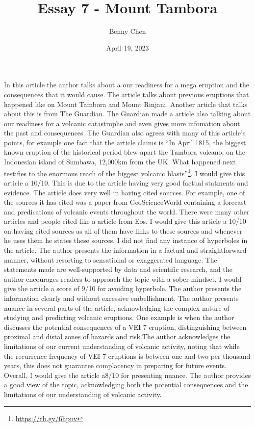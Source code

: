 \documentclass{article}
\title{Essay 7 - Mount Tambora}
\author{Benny Chen}
\date{April 19, 2023}
\begin{document}
\maketitle

In this article the author talks about a our readiness for a mega eruption and the consequences that it would cause. The article talks about previous eruptions that happened like on Mount Tambora and Mount Rinjani. Another article that talks about this is from The Guardian. The Guardian made a article also talking about our readiness for a volcanic catastrophe and even gives more infomation about the past and consequences. The Guardian also agrees with many of this article's points, for example one fact that the article claims is ``In April 1815, the biggest known eruption of the historical period blew apart the Tambora volcano, on the Indonesian island of Sumbawa, 12,000km from the UK. What happened next testifies to the enormous reach of the biggest volcanic blasts''\footnote[1]{\url{https://rb.gy/6hpnv}}. I would give this article a 10/10. This is due to the article having very good factual statments and evidence. The article does very well in having cited sources. For example, one of the sources it has cited was a paper from GeoScienceWorld containing a forecast and predications of volcanic events throughout the world. There were many other articles and people cited like a article from Eos. I would give this article a 10/10 on having cited sources as all of them have links to these sources and whenever he uses them he states these sources. I did not find any instance of hyperboles in the article. The author presents the information in a factual and straightforward manner, without resorting to sensational or exaggerated language. The statements made are well-supported by data and scientific research, and the author encourages readers to approach the topic with a sober mindset. I would give the article a score of 9/10 for avoiding hyperbole. The author presents the information clearly and without excessive embellishment. The author presents nuance in several parts of the article, acknowledging the complex nature of studying and predicting volcanic eruptions. One example is when the author discusses the potential consequences of a VEI 7 eruption, distinguishing between proximal and distal zones of hazards and risk.The author acknowledges the limitations of our current understanding of volcanic activity, noting that while the recurrence frequency of VEI 7 eruptions is between one and two per thousand years, this does not guarantee complacency in preparing for future events. Overall, I would give the article a8/10 for presenting nuance. The author provides a good view of the topic, acknowledging both the potential consequences and the limitations of our understanding of volcanic activity.
\end{document}
